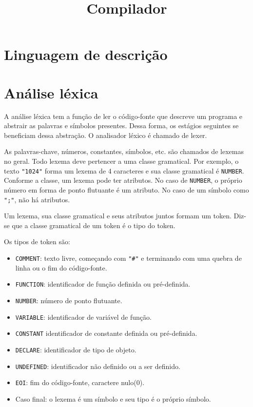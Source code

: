 \documentclass[10pt,a4paper]{article}
\title{Compilador}
\date{}
\author{}
\begin{document}
\maketitle

\section{Linguagem de descrição}

\section{Análise léxica}
A análise léxica tem a função de ler o código-fonte que descreve um programa e abstrair as palavras e símbolos presentes.
Dessa forma, os estágios seguintes se beneficiam dessa abstração. O analisador léxico é chamado de lexer.

As palavras-chave, números, constantes, símbolos, etc. são chamados de lexemas no geral.
Todo lexema deve pertencer a uma classe gramatical.
Por exemplo, o texto \texttt{"1024"} forma um lexema de 4 caracteres e sua classe gramatical é \texttt{NUMBER}.
Conforme a classe, um lexema pode ter atributos.
No caso de \texttt{NUMBER}, o próprio número em forma de ponto flutuante é um atributo.
No caso de um símbolo como \texttt{";"}, não há atributos.

Um lexema, sua classe gramatical e seus atributos juntos formam um token.
Diz-se que a classe gramatical de um token é o tipo do token.

Os tipos de token são:
\begin{itemize}
\item \texttt{COMMENT}: texto livre, começando com \texttt{"\#"} e
terminando com uma quebra de linha ou o fim do código-fonte.
\item \texttt{FUNCTION}: identificador de função definida ou pré-definida.
\item \texttt{NUMBER}: número de ponto flutuante.
\item \texttt{VARIABLE}: identificador de variável de função.
\item \texttt{CONSTANT} identificador de constante definida ou pré-definida.
\item \texttt{DECLARE}: identificador de tipo de objeto.
\item \texttt{UNDEFINED}: identificador não definido ou a ser definido.
\item \texttt{EOI}: fim do código-fonte, caractere nulo(0).
\item Caso final: o lexema é um símbolo e seu tipo é o próprio símbolo.

\end{itemize}
\end{document}
